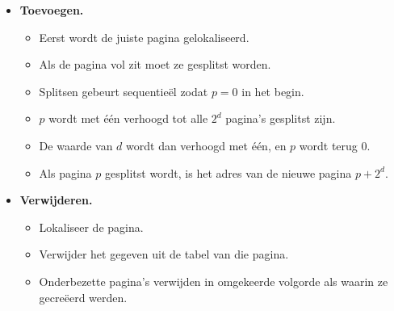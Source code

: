 \begin{itemize}
\begin{itemize}
        \item \textbf{Toevoegen.}
        \begin{itemize}
            \item Eerst wordt de juiste pagina gelokaliseerd.
            \item Als de pagina vol zit moet ze gesplitst worden.
            \item Splitsen gebeurt sequentieël zodat $p = 0$ in het begin.
            \item $p$ wordt met één verhoogd tot alle $2^d$ pagina's gesplitst zijn.
            \item De waarde van $d$ wordt dan verhoogd met één, en $p$ wordt terug 0.
            \item Als pagina $p$ gesplitst wordt, is het adres van de nieuwe pagina $p + 2^d$.
        \end{itemize}
        \item \textbf{Verwijderen.}
        \begin{itemize}
            \item Lokaliseer de pagina.
            \item Verwijder het gegeven uit de tabel van die pagina.
            \item Onderbezette pagina's verwijden in omgekeerde volgorde als waarin ze gecreëerd werden.
        \end{itemize}
    \end{itemize}                                                                                                                                                           
\end{itemize}